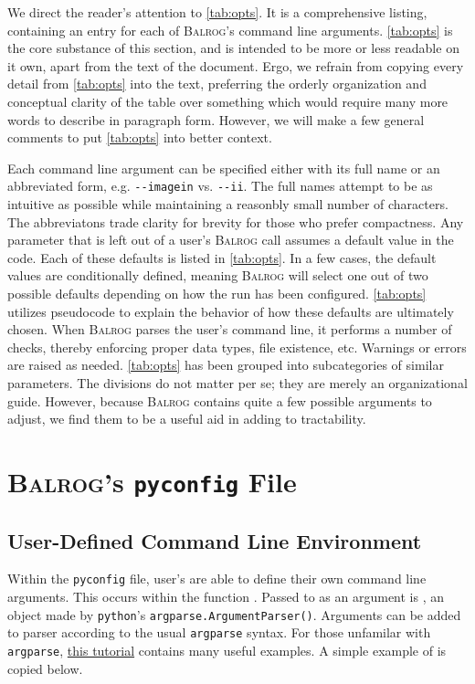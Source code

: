 \documentclass[12pt]{book}
\newcommand{\pyconfig}{\texttt{pyconfig}}
\newcommand{\balrog}{\textsc{Balrog}}
\newcommand{\opt}[1]{{\texttt{-}\texttt{-#1}}}
\begin{document}
We direct the reader's attention to \autoref{tab:opts}.
It is a comprehensive listing, containing an entry for each of \balrog{}'s command line arguments.
\autoref{tab:opts} is the core substance of this section,
and is intended to be more or less readable on it own, apart from the text of the document.
Ergo, we refrain from copying every detail from \autoref{tab:opts} into the text, 
preferring the orderly organization and conceptual clarity
of the table over something which would require many more words to describe in paragraph form.
However, we will make a few general comments to put \autoref{tab:opts} into better context.

Each command line argument can be specified either with its full name or an abbreviated form, e.g. \opt{imagein} vs. \opt{ii}.
The full names attempt to be as intuitive as possible while maintaining a reasonbly small number of characters.
The abbreviatons trade clarity for brevity for those who prefer compactness. 
Any parameter that  is left out of a user's \balrog{} call assumes a default value in the code.
Each of these defaults is listed in \autoref{tab:opts}. 
In a few cases, the default values are conditionally defined, meaning \balrog{} will select one out of
two possible defaults depending on how the run has been configured.
\autoref{tab:opts} utilizes pseudocode to explain the behavior of how these defaults are ultimately chosen.
When \balrog{} parses the user's command line, it performs a number of checks, 
thereby enforcing proper data types, file existence, etc.
Warnings or errors are raised as needed.
\autoref{tab:opts} has been grouped into subcategories of similar parameters.
The divisions do not matter per se; they are merely an organizational guide.
However, because \balrog{} contains quite a few possible arguments to adjust,
we find them to be a useful aid in adding to tractability.


\optstab{}



\chapter{\balrog{}'s \pyconfig{} File}
\label{sec:pyconfig}


\section{User-Defined Command Line Environment}
\label{sec:user}

Within the \pyconfig{} file, user's are able to
define their own command line arguments. This occurs
within the function \argsfunc{}. Passed
to \argsfunc{}  as an argument is \argsparser{},
an object made by \texttt{python}'s
\texttt{argparse.ArgumentParser()}. Arguments
can be added to parser according to the usual
\texttt{argparse} syntax.
For those unfamilar with \texttt{argparse},
\href{http://docs.python.org/2/howto/argparse.html}{this tutorial}
contains many useful examples. A simple example of
\argsfunc{} is copied below.
\end{document}
